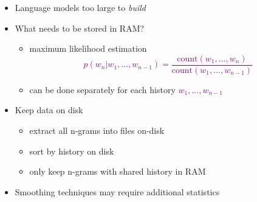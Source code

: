 \documentclass[landscape]{slides}
\newcommand{\maths}[1]{\textcolor{purple}{#1}}
\begin{document}

\begin{itemize}
\item Language models too large to {\em build} 
\item What needs to be stored in RAM?
\begin{itemize}
\item maximum likelihood estimation
\vspace{-7mm}
\maths{\begin{equation*}
p(w_n|w_1,...,w_{n-1}) = \frac{\text{count}(w_1,...,w_n)}{\text{count}(w_1,...,w_{n-1})}
\end{equation*}}
\vspace{-12mm}
\item can be done separately for each history \maths{$w_1,...,w_{n-1}$}
\end{itemize}
\item Keep data on disk
\begin{itemize}
\item extract all n-grams into files on-disk
\item sort by history on disk
\item only keep n-grams with shared history in RAM
\end{itemize}
\item Smoothing techniques may require additional statistics
\end{itemize}

\end{document}

